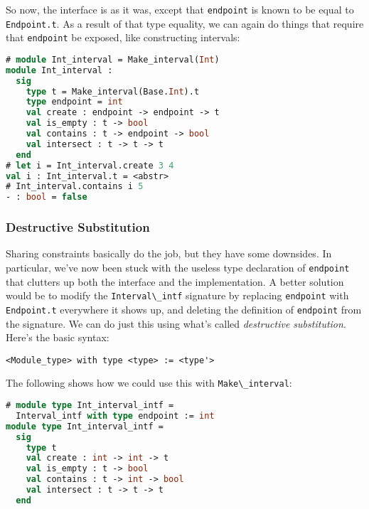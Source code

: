 So now, the interface is as it was, except that
\passthrough{\lstinline!endpoint!} is known to be equal to
\passthrough{\lstinline!Endpoint.t!}. As a result of that type equality,
we can again do things that require that
\passthrough{\lstinline!endpoint!} be exposed, like constructing
intervals:

\begin{lstlisting}[language=Caml]
# module Int_interval = Make_interval(Int)
module Int_interval :
  sig
    type t = Make_interval(Base.Int).t
    type endpoint = int
    val create : endpoint -> endpoint -> t
    val is_empty : t -> bool
    val contains : t -> endpoint -> bool
    val intersect : t -> t -> t
  end
# let i = Int_interval.create 3 4
val i : Int_interval.t = <abstr>
# Int_interval.contains i 5
- : bool = false
\end{lstlisting}

\hypertarget{destructive-substitution}{%
\subsubsection{Destructive
Substitution}\label{destructive-substitution}}

Sharing constraints basically do the job, but they have some downsides.
In particular, we've now been stuck with the useless type declaration of
\passthrough{\lstinline!endpoint!} that clutters up both the interface
and the implementation. A better solution would be to modify the
\passthrough{\lstinline!Interval\_intf!} signature by replacing
\passthrough{\lstinline!endpoint!} with
\passthrough{\lstinline!Endpoint.t!} everywhere it shows up, and
deleting the definition of \passthrough{\lstinline!endpoint!} from the
signature. We can do just this using what's called \emph{destructive
substitution}. Here's the basic syntax:

\begin{lstlisting}
<Module_type> with type <type> := <type'>
\end{lstlisting}

The following shows how we could use this with
\passthrough{\lstinline!Make\_interval!}:

\begin{lstlisting}[language=Caml]
# module type Int_interval_intf =
  Interval_intf with type endpoint := int
module type Int_interval_intf =
  sig
    type t
    val create : int -> int -> t
    val is_empty : t -> bool
    val contains : t -> int -> bool
    val intersect : t -> t -> t
  end
\end{lstlisting}


